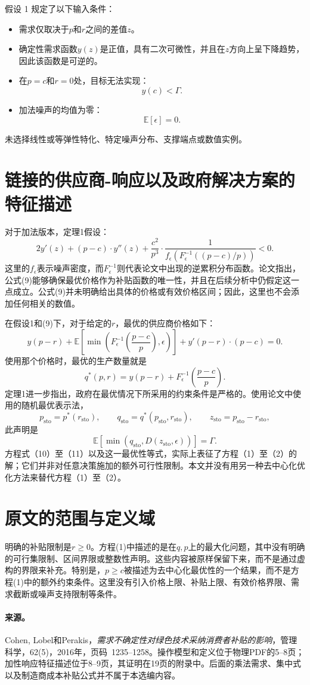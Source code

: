 \documentclass{article}
\begin{document}
假设 1 规定了以下输入条件：
\begin{itemize}
\item 需求仅取决于$p$和$r$之间的差值$z$。
\item 确定性需求函数$y(z)$是正值，具有二次可微性，并且在$z$方向上呈下降趋势，因此该函数是可逆的。
\item 在$p=c$和$r=0$处，目标无法实现：
\[
y(c)<\Gamma.
\]
\item 加法噪声的均值为零：
\[
\mathbb{E}[\epsilon]=0.
\]
\end{itemize}
未选择线性或等弹性特化、特定噪声分布、支撑端点或数值实例。

\section*{链接的供应商-响应以及政府解决方案的特征描述}
对于加法版本，定理1假设：
\begin{equation}
2y'(z)+(p-c)\cdot y''(z)
+\frac{c^2}{p^3}\cdot
\frac{1}{f_\epsilon\!\left(F_\epsilon^{-1}\!\left((p-c)/p\right)\right)}<0.
\tag{9}
\end{equation}
这里的$f_\epsilon$表示噪声密度，而$F_\epsilon^{-1}$则代表论文中出现的逆累积分布函数。论文指出，公式(9)能够确保最优价格作为补贴函数的唯一性，并且在后续分析中仍假定这一点成立。公式(9)并未明确给出具体的价格或有效价格区间；因此，这里也不会添加任何相关的数值。

在假设1和(9)下，对于给定的$r$，最优的供应商价格如下：
\begin{equation}
y(p-r)
+\mathbb{E}\left[\min\left(F_\epsilon^{-1}\!\left(\frac{p-c}{p}\right),\epsilon\right)\right]
+y'(p-r)\cdot(p-c)=0.
\tag{10}
\end{equation}
使用那个价格时，最优的生产数量就是
\begin{equation}
q^*(p,r)=y(p-r)+F_\epsilon^{-1}\!\left(\frac{p-c}{p}\right).
\tag{11}
\end{equation}
定理1进一步指出，政府在最优情况下所采用的约束条件是严格的。使用论文中使用的随机最优表示法，
\[
p_{\mathrm{sto}}=p^*(r_{\mathrm{sto}}),
\qquad
q_{\mathrm{sto}}=q^*(p_{\mathrm{sto}},r_{\mathrm{sto}}),
\qquad
z_{\mathrm{sto}}=p_{\mathrm{sto}}-r_{\mathrm{sto}},
\]
此声明是
\[
\mathbb{E}\left[\min(q_{\mathrm{sto}},D(z_{\mathrm{sto}},\epsilon))\right]=\Gamma.
\]
方程式（10）至（11）以及这一最优性等式，实际上表征了方程（1）至（2）的解；它们并非对任意决策施加的额外可行性限制。本文并没有用另一种去中心化优化方法来替代方程（1）至（2）。

\section*{原文的范围与定义域}
明确的补贴限制是$r\geq0$。方程(1)中描述的是在$q,p$上的最大化问题，其中没有明确的可行集限制、区间界限或整数性声明。这些内容被原样保留下来，而不是通过虚构的界限来补充。特别是，$p\geq c$被描述为去中心化最优性的一个结果，而不是方程(1)中的额外约束条件。这里没有引入价格上限、补贴上限、有效价格界限、需求截断或噪声支持限制等条件。

\paragraph{来源。}
Cohen, Lobel和Perakis，\emph{需求不确定性对绿色技术采纳消费者补贴的影响}，管理科学，62(5)，2016年，页码~1235--1258。操作模型和定义位于物理PDF的5--8页；加性响应特征描述位于8--9页，其证明在19页的附录中。后面的乘法需求、集中式以及制造商成本补贴公式并不属于本选编内容。
\end{document}
